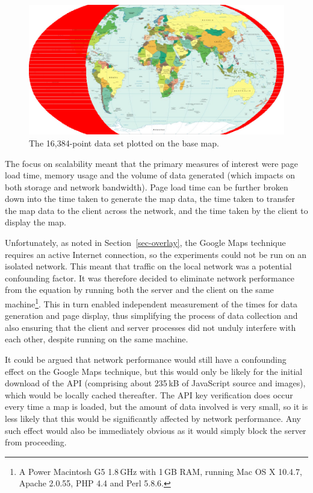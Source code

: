 \documentclass[acmnow]{acmtrans2m}
\begin{document}
\begin{figure}
	\centering
	\includegraphics[width=\textwidth,keepaspectratio]{16384_points}
	\caption{The 16,384-point data set plotted on the base map.}
	\label{fig-grid-points}
\end{figure}


The focus on scalability meant that the primary measures of interest
were page load time, memory usage and the volume of data generated
(which impacts on both storage and network bandwidth). Page load time
can be further broken down into the time taken to generate the map data,
the time taken to transfer the map data to the client across the
network, and the time taken by the client to display the map.

Unfortunately, as noted in Section~\ref{sec-overlay}, the Google Maps
technique requires an active Internet connection, so the experiments
could not be run on an isolated network. This meant that traffic on the
local network was a potential confounding factor. It was therefore
decided to eliminate network performance from the equation by running
both the server and the client on the same machine\footnote{A Power
Macintosh G5 1.8\,GHz with 1\,GB RAM, running Mac OS X 10.4.7, Apache
2.0.55, PHP 4.4 and Perl 5.8.6.}. This in turn enabled independent
measurement of the times for data generation and page display, thus
simplifying the process of data collection and also ensuring that the
client and server processes did not unduly interfere with each other,
despite running on the same machine.

It could be argued that network performance would still have a
confounding effect on the Google Maps technique, but this would only be
likely for the initial download of the API (comprising about 235\,kB of
JavaScript source and images), which would be locally cached thereafter.
The API key verification does occur every time a map is loaded, but
the amount of data involved is very small, so it is less likely that
this would be significantly affected by network performance. Any such
effect would also be immediately obvious as it would simply block the
server from proceeding.
\end{document}
